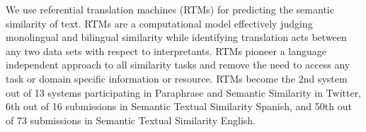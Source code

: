 We use referential translation machines (RTMs) for predicting the semantic similarity of text. RTMs are a computational model effectively judging monolingual and bilingual similarity while identifying translation acts between any two data sets with respect to interpretants. RTMs pioneer a language independent approach to all similarity tasks and remove the need to access any task or domain specific information or resource. RTMs become the 2nd system out of 13 systems participating in Paraphrase and Semantic Similarity in Twitter, 6th out of 16 submissions in Semantic Textual Similarity Spanish, and 50th out of 73 submissions in Semantic Textual Similarity English.
